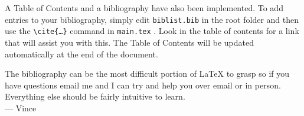 \documentclass[12pt]{article}
\begin{document}
A Table of Contents and a bibliography have also been implemented. To add entries to your bibliography, simply edit \texttt{biblist.bib} in the root folder and then use the \texttt{\textbackslash cite\{\ldots\}} command in \texttt{main.tex} \cite{bibtex}. Look in the table of contents for a link that will assist you with this. The Table of Contents will be updated automatically at the end of the document.
%
%
%

The bibliography can be the most difficult portion of LaTeX to grasp so if you have questions email me and I can try and help you over email or in person. Everything else should be fairly intuitive to learn. \\

\hspace{1 cm}--- Vince


\newpage


\end{document}

